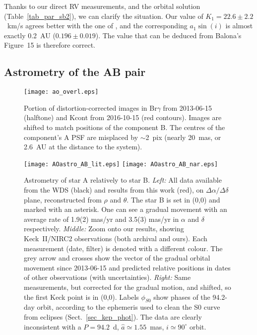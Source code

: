 \documentclass{aa}
\begin{document}
Thanks to our direct RV measurements, and the orbital solution 
(Table~\ref{tab_par_sb2}), we can clarify the situation. Our value of 
$K_1=22.6\pm2.2$~km/s agrees better with the one of \citet{shi12}, and the 
corresponding $a_1\sin(i)$ is almost exactly 0.2~AU ($0.196\pm0.019$). The value 
that can be deduced from Balona's Figure~15 is therefore correct. 

\subsection{Astrometry of the AB pair}\label{sec_ao_AB}

\begin{figure}
\centering
\texttt{[image: ao\_overl.eps]}
\caption{Portion of distortion-corrected images in Br$\gamma$ from 2013-06-15
(halftone) and Kcont from 2016-10-15 (red contours). Images are shifted to match
positions of the component B. The centres of the component's A PSF are misplaced
by $\sim$2~pix (nearly 20~mas, or 2.6~AU at the distance to the system).
}\label{ao_fits}
\end{figure}

\begin{figure*}
\centering
\texttt{[image: AOastro\_AB\_lit.eps]}
\texttt{[image: AOastro\_AB\_nar.eps]}
\caption{Astrometry of star A relatively to star B. 
{\it Left:} All data available from the WDS (black) and results from this work (red), 
on $\Delta\alpha/\Delta\delta$ plane, reconstructed from $\rho$ and $\theta$.
The star B is set in (0,0) and marked with an asterisk.
One can see a gradual movement with an average rate of 1.9(2) mas/yr and 3.5(3) mas/yr 
in $\alpha$ and $\delta$ respectively.
{\it Middle:} Zoom onto our results, showing Keck~II/NIRC2 observations (both archival and
ours). Each measurement (date, filter) is denoted with a different colour. The grey arrow
and crosses show the vector of the gradual orbital movement since 2013-06-15 and predicted 
relative positions in dates of other observations (with uncertainties).
{\it Right:} Same measurements, but corrected for the gradual motion, and shifted, so the
first Keck point is in (0,0). Labels $\phi_{S0}$ show phases of the 94.2-day orbit, according
to the ephemeris used to clean the S0 curve from eclipses (Sect.~\ref{sec_kep_phot}). 
The data are clearly inconsistent with a $P=94.2$~d, $\hat{a}\simeq1.55$~mas,
$i\simeq90^\circ$ orbit.
}\label{ao_astro_AB}
\end{figure*}
\end{document}
